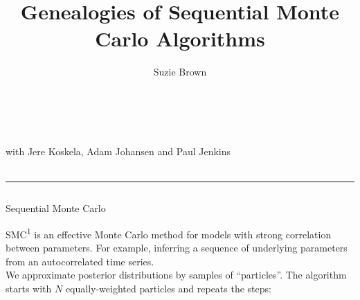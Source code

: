 \documentclass[final, 12pt]{beamer}
\title{Genealogies of Sequential Monte Carlo Algorithms}
\author{Suzie Brown}
\institute{Department of Statistics, University of Warwick}
\date{}
\newlength{\colwidth}
\begin{document}
\begin{frame}

\vspace*{-35pt}

\centering
{}

\vspace*{-220pt}

\huge{\inserttitle}\\[2pt]
\Large{\insertauthor}\\[7pt]
\large{with Jere Koskela, Adam Johansen and Paul Jenkins}\\[7pt]
\normalsize{\insertinstitute}\\[25pt]
\hrule

\vspace*{-10pt}

\begin{columns}
\begin{column}{\colwidth}
\begin{block}{Sequential Monte Carlo}

SMC\textsuperscript{1} is an effective Monte Carlo method for models with strong correlation between parameters. For example, inferring a sequence of underlying parameters from an autocorrelated time series.\\[12pt]

We approximate posterior distributions by samples of ``particles''. The algorithm starts with $N$ equally-weighted particles and repeats the steps:
\begin{center}
\end{center}
\end{block}
\end{column}
\end{columns}
\end{frame}
\end{document}
